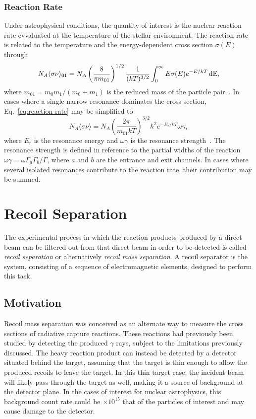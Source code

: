 \subsubsection{Reaction Rate}
Under astrophysical conditions, the quantity of interest is the nuclear
reaction rate evvaluated at the temperature of the stellar environment. The
reaction rate is related to the temperature and the energy-dependent cross
section $\sigma(E)$ through
\begin{equation}
\label{eq:reaction-rate}
    N_A\langle\sigma\nu\rangle_{01} = N_A\left(\frac{8}{\pi m_{01}}\right)^{1/2}
        \frac{1}{(kT)^{3/2}}\int_0^{\infty} E\sigma(E)e^{-E/kT}\,\rm{d}E,
\end{equation}
where $m_{01} = m_0m_1/(m_0 + m_1)$ is the reduced mass of the particle
pair~\cite{Iliadis}. In cases where a single narrow resonance dominates the
cross section, Eq.~\ref{eq:reaction-rate} may be simplified to
\[
    N_A\langle\sigma\nu\rangle = N_A\left(\frac{2\pi}{m_{01}kT}\right)^{3/2}
        \hbar^2e^{-E_r/kT}\omega\gamma,
\]
where $E_r$ is the resonance energy and $\omega\gamma$ is the resonance
strength~\cite{Iliadis}. The resonance strength is defined in reference to the
partial widths of the reaction $\omega\gamma = \omega\Gamma_a\Gamma_b/\Gamma$,
where $a$ and $b$ are the entrance and exit channels. In cases where several
isolated resonances contribute to the reaction rate, their contribution may be
summed.



\section{Recoil Separation}
\label{sec:ch01-recoil-separation}

The experimental process in which the reaction products produced by a direct
beam can be filtered out from that direct beam in order to be detected is
called \emph{recoil separation} or alternatively \emph{recoil mass separation}.
A recoil separator is the system, consisting of a sequence of electromagnetic
elements, designed to perform this task.

\subsection{Motivation}

Recoil mass separation was conceived as an alternate way to measure the cross
sections of radiative capture reactions. These reactions had previously been
studied by detecting the produced $\gamma$ rays, subject to the limitations
previously discussed. The heavy reaction product can instead be detected by a
detector situated behind the target, assuming that the target is thin enough to
allow the produced recoils to leave the target. In this thin target case, the
incident beam will likely pass through the target as well, making it a source
of background at the detector plane. In the cases of interest for nuclear
astrophysics, this background count rate could be $\times 10^{15}$ that of the
particles of interest and may cause damage to the detector.

